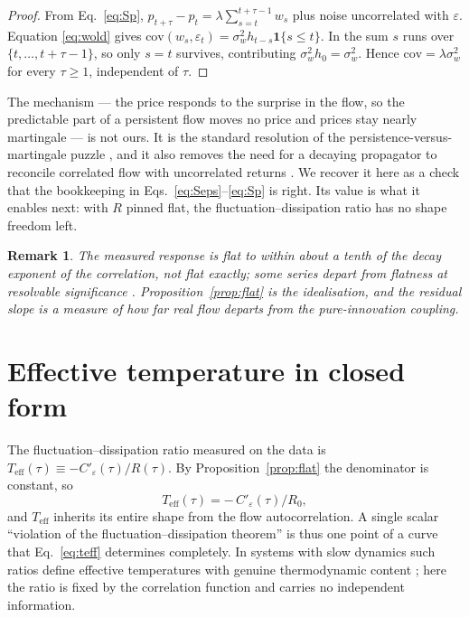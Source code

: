 \documentclass[aps,pre,twocolumn,superscriptaddress,floatfix,nofootinbib]{revtex4-2}
\newcommand{\eps}{\varepsilon}
\newcommand{\Teff}{T_{\mathrm{eff}}}
\newtheorem{remark}{Remark}
\begin{document}
\begin{proof}
From Eq.~\eqref{eq:Sp}, $p_{t+\tau}-p_t=\lambda\sum_{s=t}^{t+\tau-1}w_s$ plus
noise uncorrelated with $\eps$. Equation \eqref{eq:wold} gives
$\mathrm{cov}(w_s,\eps_t)=\sigma_w^2h_{t-s}\mathbf1\{s\le t\}$. In the sum $s$
runs over $\{t,\dots,t+\tau-1\}$, so only $s=t$ survives, contributing
$\sigma_w^2h_0=\sigma_w^2$. Hence $\mathrm{cov}=\lambda\sigma_w^2$ for every
$\tau\ge1$, independent of $\tau$.
\end{proof}

The mechanism --- the price responds to the surprise in the flow, so the
predictable part of a persistent flow moves no price and prices stay nearly
martingale --- is not ours. It is the standard resolution of the
persistence-versus-martingale puzzle \cite{gerig2008,jaisson2014,muhlekarbe2026},
and it also removes the need for a decaying propagator to reconcile correlated
flow with uncorrelated returns \cite{bouchaud2004,bouchaud2018}. We recover it
here as a check that the bookkeeping in Eqs.~\eqref{eq:Seps}--\eqref{eq:Sp} is
right. Its value is what it enables next: with $R$ pinned flat, the
fluctuation--dissipation ratio has no shape freedom left.

\begin{remark}
The measured response is flat to within about a tenth of the decay exponent of
the correlation, not flat exactly; some series depart from flatness at
resolvable significance \cite{paper1}. Proposition~\ref{prop:flat} is the
idealisation, and the residual slope is a measure of how far real flow departs
from the pure-innovation coupling.
\end{remark}

\section{Effective temperature in closed form}
\label{sec:teff}

The fluctuation--dissipation ratio measured on the data is
$\Teff(\tau)\equiv-C'_\eps(\tau)/R(\tau)$. By Proposition~\ref{prop:flat} the
denominator is constant, so
\begin{equation}
  \Teff(\tau)=-\,C'_\eps(\tau)/R_0 ,
  \label{eq:teff}
\end{equation}
and $\Teff$ inherits its entire shape from the flow autocorrelation. A single
scalar ``violation of the fluctuation--dissipation theorem'' is thus one point of
a curve that Eq.~\eqref{eq:teff} determines completely. In systems with slow
dynamics such ratios define effective temperatures with genuine thermodynamic
content \cite{cugliandolo1997}; here the ratio is fixed by the correlation
function and carries no independent information.
\end{document}
